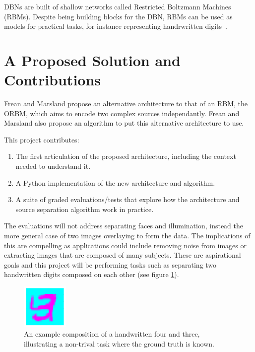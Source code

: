 DBNs are built of shallow networks called Restricted Boltzmann Machines (RBMs). Despite being building blocks for the DBN, RBMs can be used as models for practical tasks, for instance representing handrwritten digits~\cite{fischer2014training}.

\section{A Proposed Solution and Contributions}

Frean and Marsland propose an alternative architecture to that of an RBM, the ORBM, which aims to encode two complex sources independantly. Frean and Marsland also propose an algorithm to put this alternative architecture to use.

This project contributes:
\begin{enumerate}[$\mathcal{C}$1.]
  \item\label{item-c1} The first articulation of the proposed architecture, including the context needed to understand it.
  \item\label{item-c2} A Python implementation of the new architecture and algorithm.
  \item\label{item-c3} A suite of graded evaluations/tests that explore how the architecture and source separation algorithm work in practice.
\end{enumerate}
The evaluations will not address separating faces and illumination, instead the more general case of two images overlaying to form the data. The implications of this are compelling as applications could include removing noise from images or extracting images that are composed of many subjects. These are aspirational goals and this project will be performing tasks such as separating two handwritten digits composed on each other (see figure \ref{F:Composition-Example}).

\begin{figure}[h]
\begin{center}
  \includegraphics[width = 0.2\textwidth]{Assets/composition-example.png}
\caption{An example composition of a handwritten four and three, illustrating a non-trival task where the ground truth is known.}
\label{F:Composition-Example}
\end{center}
\end{figure}


